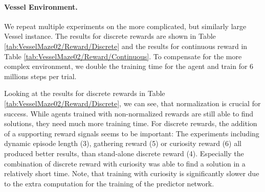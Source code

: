 \paragraph{Vessel Environment.} We repeat multiple experiments on the more complicated, but similarly large Vessel instance. The results for discrete rewards are shown in Table \ref{tab:VesselMaze02/Reward/Discrete} and the results for continuous reward in Table \ref{tab:VesselMaze02/Reward/Continuous}. To compensate for the more complex environment, we double the training time for the agent and train for 6 millions steps per trial. 

Looking at the results for discrete rewards in Table \ref{tab:VesselMaze02/Reward/Discrete}, we can see, that normalization is crucial for success. While agents trained with non-normalized rewards are still able to find solutions, they need much more training time. For discrete rewards, the addition of a supporting reward signals seems to be important: The experiments including dynamic episode length (3), gathering reward (5) or curiosity reward (6) all produced better results, than stand-alone discrete reward (4). Especially the combination of discrete reward with curiosity was able to find a solution in a relatively short time. Note, that training with curiosity is significantly slower due to the extra computation for the training of the predictor network. 

